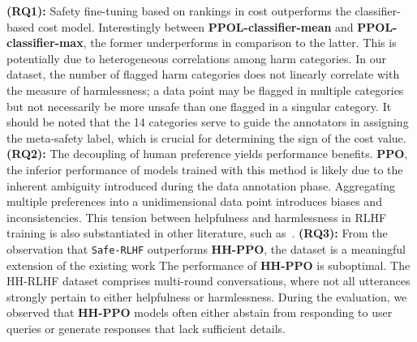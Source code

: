 \documentclass{article}
\begin{document}
\textbf{(RQ1):} Safety fine-tuning based on rankings in cost outperforms the classifier-based cost model. Interestingly between \textbf{PPOL-classifier-mean} and \textbf{PPOL-classifier-max}, the former underperforms in comparison to the latter. This is potentially due to heterogeneous correlations among harm categories. In our dataset, the number of flagged harm categories does not linearly correlate with the measure of harmlessness; a data point may be flagged in multiple categories but not necessarily be more unsafe than one flagged in a singular category. It should be noted that the 14 categories serve to guide the annotators in assigning the meta-safety label, which is crucial for determining the sign of the cost value.
\textbf{(RQ2):} The decoupling of human preference yields performance benefits. \textbf{PPO}, the inferior performance of models trained with this method is likely due to the inherent ambiguity introduced during the data annotation phase. Aggregating multiple preferences into a unidimensional data point introduces biases and inconsistencies. This tension between helpfulness and harmlessness in RLHF training is also substantiated in other literature, such as~\cite{llama2,Bai2022-mt}.
\textbf{(RQ3):} From the observation that \texttt{Safe-RLHF} outperforms \textbf{HH-PPO}, the dataset is a meaningful extension of the existing work The performance of \textbf{HH-PPO} is suboptimal. The HH-RLHF dataset comprises multi-round conversations, where not all utterances strongly pertain to either helpfulness or harmlessness. During the evaluation, we observed that \textbf{HH-PPO} models often either abstain from responding to user queries or generate responses that lack sufficient details.




\end{document}
